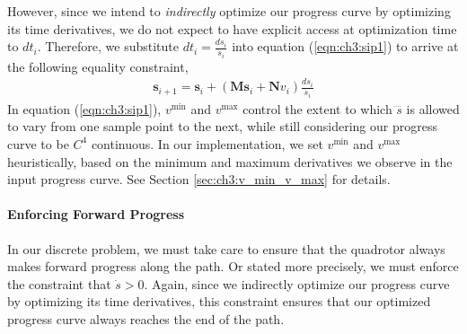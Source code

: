 However, since we intend to \emph{indirectly} optimize our progress curve by optimizing its time derivatives, we do not expect to have explicit access at optimization time to $dt_i$.
Therefore, we substitute $dt_i = \frac{ds_i}{\dot{s}_i}$ into equation (\ref{eqn:ch3:sip1}) to arrive at the following equality constraint,
%
\begin{equation}
\begin{aligned}
\mathbf{s}_{i+1} = \mathbf{s}_{i} + (\mathbf{M}\mathbf{s}_{i} + \mathbf{N}v_{i}) \frac{ds_i}{\dot{s}_i}
\end{aligned}
\end{equation}
%
In equation (\ref{eqn:ch3:sip1}), $v^{\text{min}}$ and $v^{\text{max}}$ control the extent to which $\ddddot{s}$ is allowed to vary from one sample point to the next, while still considering our progress curve to be $C^4$ continuous.
In our implementation, we set $v^{\text{min}}$ and $v^{\text{max}}$ heuristically, based on the minimum and maximum derivatives we observe in the input progress curve.
See Section \ref{sec:ch3:v_min_v_max} for details.

\paragraph{Enforcing Forward Progress}
In our discrete problem, we must take care to ensure that the quadrotor always makes forward progress along the path.
Or stated more precisely, we must enforce the constraint that $\dot{s} > 0$.
Again, since we indirectly optimize our progress curve by optimizing its time derivatives, this constraint ensures that our optimized progress curve always reaches the end of the path.

